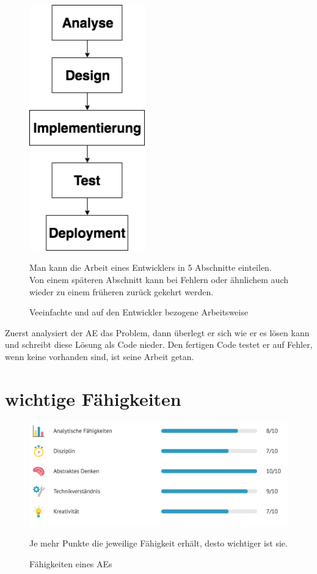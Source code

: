     \begin{figure}[H]
        \centering
        \includegraphics[width=5cm]{include/images/Arbeitsweise.png}
        \caption{Veeinfachte und auf den Entwickler bezogene Arbeitsweise}
        \small Man kann die Arbeit eines Entwicklers in 5 Abschnitte einteilen. Von einem späteren Abschnitt kann bei Fehlern oder ähnlichem auch wieder zu einem früheren zurück gekehrt werden.
        \label{fig-Arbeitsschema}
    \end{figure}

    Zuerst analysiert der AE das Problem, dann überlegt er sich wie er es lösen kann und schreibt diese Lösung als Code nieder. Den fertigen Code testet er auf Fehler, wenn keine vorhanden sind, ist seine Arbeit getan. 

\section{wichtige Fähigkeiten}

\begin{figure}[H]
    \centering
    \includegraphics[width=\textwidth]{include/images/Faehigkeiten.png}
    \caption{Fähigkeiten eines AEs}
    \small Je mehr Punkte die jeweilige Fähigkeit erhält, desto wichtiger ist sie.
    \label{fig-Faehigkeiten}
\end{figure}

